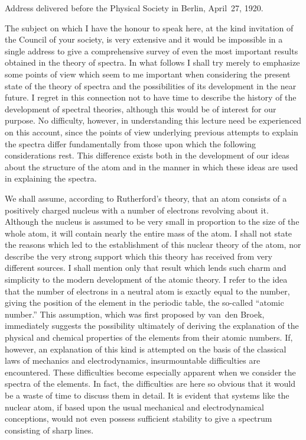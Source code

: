   {Address delivered before the Physical Society in Berlin, April~27, 1920.}


The subject on which I have the honour to speak here, at the
kind invitation of the Council of your society, is very extensive and
it would be impossible in a single address to give a comprehensive
survey of even the most important results obtained in the theory
of spectra. In what follows I shall try merely to emphasize some
points of view which seem to me important when considering the
present state of the theory of spectra and the possibilities of its
development in the near future. I regret in this connection not to
have time to describe the history of the development of spectral
theories, although this would be of interest for our purpose. No
difficulty, however, in understanding this lecture need be experienced
on this account, since the points of view underlying previous
attempts to explain the spectra differ fundamentally from those upon
which the following considerations rest. This difference exists both
in the development of our ideas about the structure of the atom
and in the manner in which these ideas are used in explaining the
spectra.

We shall assume, according to Rutherford's theory, that an atom
consists of a positively charged nucleus with a number of electrons
revolving about it. Although the nucleus is assumed to be very
small in proportion to the size of the whole atom, it will contain
nearly the entire mass of the atom. I shall not state the reasons
which led to the establishment of this nuclear theory of the atom,
nor describe the very strong support which this theory has received
from very different sources. I shall mention only that result
which lends such charm and simplicity to the modern development
of the atomic theory. I refer to the idea that the number of electrons
in a neutral atom is exactly equal to the number, giving the
position of the element in the periodic table, the so-called ``atomic
number.'' This assumption, which was first proposed by van~den
Broek, immediately suggests the possibility ultimately of deriving
the explanation of the physical and chemical properties of the
elements from their atomic numbers. If, however, an explanation
of this kind is attempted on the basis of the classical laws of
mechanics and electrodynamics, insurmountable difficulties are encountered.
These difficulties become especially apparent when we
consider the spectra of the elements. In fact, the difficulties are
here so obvious that it would be a waste of time to discuss them in
detail. It is evident that systems like the nuclear atom, if based
upon the usual mechanical and electrodynamical conceptions,
would not even possess sufficient stability to give a spectrum consisting
of sharp lines.

